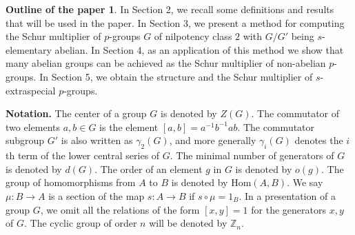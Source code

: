 \documentclass[preprint,sort&compress,12pt]{elsarticle}
\numberwithin{equation}{section}
\theoremstyle{definition}
\newtheorem*{Outline}{Outline of the paper}
\begin{document}
	
\begin{Outline} In Section 2, we recall some definitions and results that will be used in the paper. In Section 3, we present a method for computing the Schur multiplier of $p$-groups $G$ of nilpotency class $2$ with $G/G'$ being $s$-elementary abelian. In Section 4, as an application of this method we show that many abelian groups can be achieved as the Schur multiplier of non-abelian $p$-groups. In Section 5, we obtain the structure and the Schur multiplier of $s$-extraspecial $p$-groups. 
\end{Outline}
\noindent\textbf{Notation.}
The center of a group \(G\) is denoted by \(Z(G)\). The commutator of two elements $a,b \in G$  is the element $[a,b]=a^{-1}b^{-1}ab$.
The commutator subgroup \(G'\) is also written as \(\gamma_{2}(G)\), and more generally
\(\gamma_{i}(G)\) denotes the \(i\)th term of the lower central series of \(G\).
The
minimal number of generators of \(G\) is denoted by \(d(G)\). The order of an element $g$ in $G$ is denoted by $o(g)$. The group of homomorphisms from $A$ to $B$ is denoted by $\text{Hom}(A,B)$.
We say $\mu:B \to A$ is a section of the map $s: A \to B$ if  $s \circ \mu=1_B$. In a presentation of a group $G$, 
we omit all the relations of the form $[x,y]=1$ for the generators $x,y$ of $G$. The cyclic group of order $n$ will be denoted by $\mathbb{Z}_n$.
\end{document}

